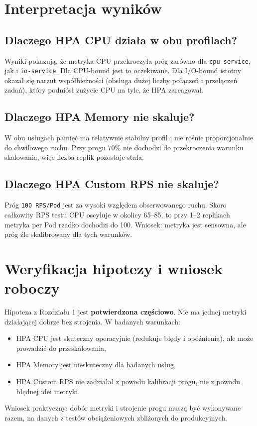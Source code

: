 \section{Interpretacja wyników}

\subsection{Dlaczego HPA CPU działa w obu profilach?}

Wyniki pokazują, że metryka CPU przekroczyła próg zarówno dla \texttt{cpu-service}, jak i \texttt{io-service}. Dla CPU-bound jest to oczekiwane. Dla I/O-bound istotny okazał się narzut współbieżności (obsługa dużej liczby połączeń i przełączeń zadań), który podniósł zużycie CPU na tyle, że HPA zareagował.

\subsection{Dlaczego HPA Memory nie skaluje?}

W obu usługach pamięć ma relatywnie stabilny profil i nie rośnie proporcjonalnie do chwilowego ruchu. Przy progu 70\% nie dochodzi do przekroczenia warunku skalowania, więc liczba replik pozostaje stała.

\subsection{Dlaczego HPA Custom RPS nie skaluje?}

Próg \texttt{100 RPS/Pod} jest za wysoki względem obserwowanego ruchu. Skoro całkowity RPS testu CPU oscyluje w okolicy 65--85, to przy 1--2 replikach metryka per Pod rzadko dochodzi do 100. Wniosek: metryka jest sensowna, ale próg źle skalibrowany dla tych warunków.

\section{Weryfikacja hipotezy i wniosek roboczy}

Hipoteza z Rozdziału 1 jest \textbf{potwierdzona częściowo}. Nie ma jednej metryki działającej dobrze bez strojenia. W badanych warunkach:

\begin{itemize}
  \item HPA CPU jest skuteczny operacyjnie (redukuje błędy i opóźnienia), ale może prowadzić do przeskalowania,
  \item HPA Memory jest nieskuteczny dla badanych usług,
  \item HPA Custom RPS nie zadziałał z powodu kalibracji progu, nie z powodu błędnej idei metryki.
\end{itemize}

Wniosek praktyczny: dobór metryki i strojenie progu muszą być wykonywane razem, na danych z testów obciążeniowych zbliżonych do produkcyjnych.
